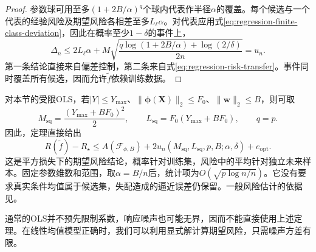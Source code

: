 \begin{proof}
参数球可用至多$(1+2B/\alpha)^q$个球内代表作半径$\alpha$的覆盖。每个候选与一个代表的经验风险及期望风险各相差至多$L_{\ell}\alpha$。对代表应用式\eqref{eq:regression-finite-class-deviation}，因此在概率至少$1-\delta$的事件上，
\begin{equation}
 \Delta_n\leq2L_{\ell}\alpha
  +M\sqrt{\frac{q\log(1+2B/\alpha)+\log(2/\delta)}{2n}}
 =u_n.
 \label{eq:regression-parametric-deviation}
\end{equation}
第一条结论直接来自偏差控制，第二条来自式\eqref{eq:regression-risk-transfer}。事件同时覆盖所有候选，因而允许$\widetilde f$依赖训练数据。
\end{proof}

对本节的受限OLS，若$|Y|\leq Y_{\max}$、$\|\bm\phi(\bm X)\|_2\leq F_0$、$\|\bm w\|_2\leq B$，则可取
\[
 M_{\mathrm{sq}}=\frac{(Y_{\max}+BF_0)^2}{2},\qquad
 L_{\mathrm{sq}}=F_0(Y_{\max}+BF_0),\qquad q=p.
\]
因此，定理直接给出
\[
 R(\widetilde f)-R_{\star}
 \leq A(\mathcal F_{\phi,B})
 +2u_n(M_{\mathrm{sq}},L_{\mathrm{sq}},p,B;\alpha,\delta)
 +e_{\mathrm{opt}}.
\]
这是平方损失下的期望风险结论，概率针对训练集，风险中的平均针对独立未来样本。固定参数维数和范围，取$\alpha=B/n$后，统计项为$O(\sqrt{p\log n/n})$。它没有要求真实条件均值属于候选集，失配造成的逼近误差仍保留。一般风险估计的依据见。

通常的OLS并不预先限制系数，响应噪声也可能无界，因而不能直接使用上述定理。在线性均值模型正确时，我们可以利用显式解计算期望风险，只需噪声方差有限。
